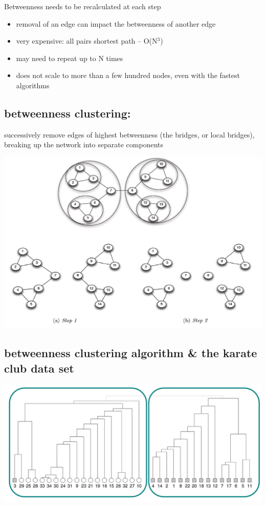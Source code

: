 \documentclass[11pt]{article}
\theoremstyle{definition}
\begin{document}
Betweenness needs to be recalculated at each step

\begin{itemize}
    \item removal of an edge can impact the betweenness of another
    edge
    \item very expensive: all pairs shortest path – O(N$^3$)
    \item may need to repeat up to N times
    \item does not scale to more than a few hundred nodes, even with
    the fastest algorithms
\end{itemize}

\subsection{betweenness clustering:}
successively remove edges of highest betweenness (the bridges, or local
bridges), breaking up the network into separate components

\includegraphics[width=\textwidth/2]{23.png}

\subsection{betweenness clustering algorithm \& the karate club data set}
\includegraphics[width=\textwidth/2]{24.png}
\end{document}
